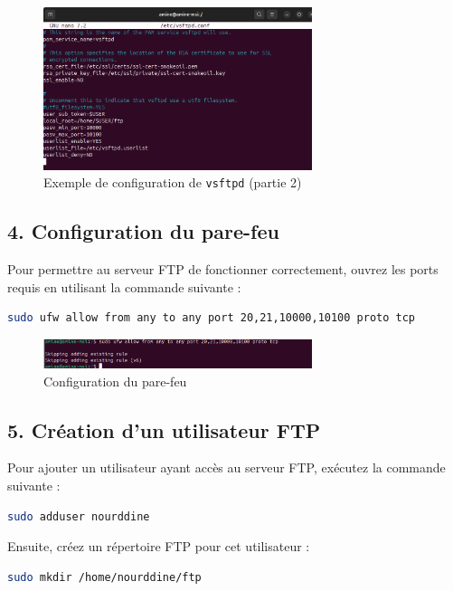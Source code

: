 \begin{figure}[h]
	\centering
	\includegraphics[width=0.7\textwidth]{FTP/vsftp-conf2.png}
	\caption{Exemple de configuration de \texttt{vsftpd} (partie 2)}
	\label{fig:conf2}
\end{figure}

\subsection*{4. Configuration du pare-feu}
Pour permettre au serveur FTP de fonctionner correctement, ouvrez les ports requis en utilisant la commande suivante :

\begin{lstlisting}[language=bash]
sudo ufw allow from any to any port 20,21,10000,10100 proto tcp
\end{lstlisting}

\begin{figure}[h]
	\centering
	\includegraphics[width=0.7\textwidth]{FTP/proto.png}
	\caption{Configuration du pare-feu}
	\label{fig:firewall}
\end{figure}

\subsection*{5. Cr\'eation d'un utilisateur FTP}
Pour ajouter un utilisateur ayant acc\`es au serveur FTP, ex\'ecutez la commande suivante :

\begin{lstlisting}[language=bash]
sudo adduser nourddine
\end{lstlisting}

Ensuite, cr\'eez un r\'epertoire FTP pour cet utilisateur :

\begin{lstlisting}[language=bash]
sudo mkdir /home/nourddine/ftp
\end{lstlisting}

